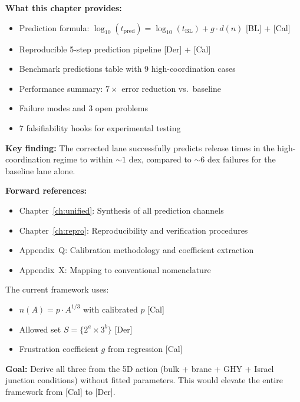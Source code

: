\begin{resultbox}
    \textbf{What this chapter provides:}
    \begin{itemize}
        \item Prediction formula: $\log_{10}(t_{\text{pred}}) =
              \log_{10}(t_{\text{BL}}) + g \cdot d(n)$ [BL] + [Cal]
        \item Reproducible 5-step prediction pipeline [Der] + [Cal]
        \item Benchmark predictions table with 9 high-coordination cases
        \item Performance summary: $7\times$ error reduction vs.\ baseline \tagCal
        \item Failure modes and 3 open problems
        \item 7 falsifiability hooks for experimental testing
    \end{itemize}

    \textbf{Key finding:}
    The corrected lane successfully predicts release times in the
    high-coordination regime to within $\sim 1$ dex, compared to
    $\sim 6$ dex failures for the baseline lane alone.
\end{resultbox}

\bigskip
\noindent
\textbf{Forward references:}
\begin{itemize}
    \item Chapter~\ref{ch:unified}: Synthesis of all prediction channels
    \item Chapter~\ref{ch:repro}: Reproducibility and verification procedures
    \item Appendix~Q: Calibration methodology and coefficient extraction
    \item Appendix~X: Mapping to conventional nomenclature
\end{itemize}

\begin{edcopenbox}[title=Open Problem: First-Principles Derivation]
    The current framework uses:
    \begin{itemize}
        \item $n(A) = p \cdot A^{1/3}$ with calibrated $p$ [Cal]
        \item Allowed set $S = \{2^a \times 3^b\}$ [Der]
        \item Frustration coefficient $g$ from regression [Cal]
    \end{itemize}
    \textbf{Goal:} Derive all three from the 5D action
    (bulk + brane + GHY + Israel junction conditions) without fitted
    parameters. This would elevate the entire framework from [Cal] to [Der].
    \tagOpen
\end{edcopenbox}


